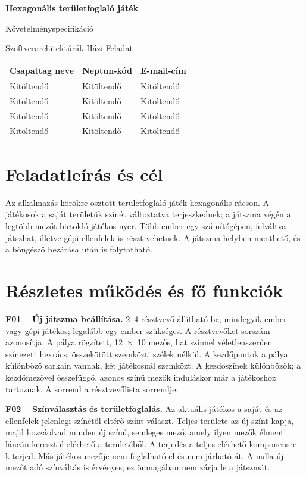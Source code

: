 \documentclass[11pt,a4paper]{article}
\newcommand{\tagA}{Kitöltendő}
\newcommand{\tagB}{Kitöltendő}
\newcommand{\tagC}{Kitöltendő}
\newcommand{\tagD}{Kitöltendő}
\newcommand{\neptunA}{Kitöltendő}
\newcommand{\neptunB}{Kitöltendő}
\newcommand{\neptunC}{Kitöltendő}
\newcommand{\neptunD}{Kitöltendő}
\newcommand{\emailA}{Kitöltendő}
\newcommand{\emailB}{Kitöltendő}
\newcommand{\emailC}{Kitöltendő}
\newcommand{\emailD}{Kitöltendő}
\begin{document}
\begin{center}
{\Large\bfseries Hexagonális területfoglaló játék\par}
{\large Követelményspecifikáció\par}
Szoftverarchitektúrák Házi Feladat
\end{center}

\begin{tabularx}{\linewidth}{@{}YYY@{}}
\toprule
Csapattag neve & Neptun-kód & E-mail-cím \\
\midrule
\tagA & \neptunA & \emailA \\
\tagB & \neptunB & \emailB \\
\tagC & \neptunC & \emailC \\
\tagD & \neptunD & \emailD \\
\bottomrule
\end{tabularx}

\section{Feladatleírás és cél}
Az alkalmazás körökre osztott területfoglaló játék hexagonális rácson.
A játékosok a saját területük színét változtatva terjeszkednek; a játszma
végén a legtöbb mezőt birtokló játékos nyer. Több ember egy számítógépen,
felváltva játszhat, illetve gépi ellenfelek is részt vehetnek.
A játszma helyben menthető, és a böngésző bezárása után is folytatható.

\section{Részletes működés és fő funkciók}
\textbf{F01 -- Új játszma beállítása.}
2--4 résztvevő állítható be, mindegyik emberi vagy gépi játékos; legalább
egy ember szükséges. A résztvevőket sorszám azonosítja. A pálya rögzített,
12~$\times$~10 mezős, hat színnel véletlenszerűen színezett hexrács,
összekötött szemközti szélek nélkül. A kezdőpontok a pálya különböző
sarkain vannak, két játékosnál szemközt. A kezdőszínek különbözők;
a kezdőmezővel összefüggő, azonos színű mezők induláskor már a játékoshoz
tartoznak. A sorrend a résztvevőlista sorrendje.

\textbf{F02 -- Színválasztás és területfoglalás.}
Az aktuális játékos a saját és az ellenfelek jelenlegi színétől eltérő
színt választ. Teljes területe az új színt kapja, majd hozzáolvad minden
új színű, semleges mező, amely ilyen mezők élmenti láncán keresztül
elérhető a területéből. A terjedés a teljes elérhető komponensre kiterjed.
Más játékos mezője nem foglalható el és nem járható át. A nulla új mezőt
adó színváltás is érvényes; ez önmagában nem zárja le a játszmát.
\end{document}
